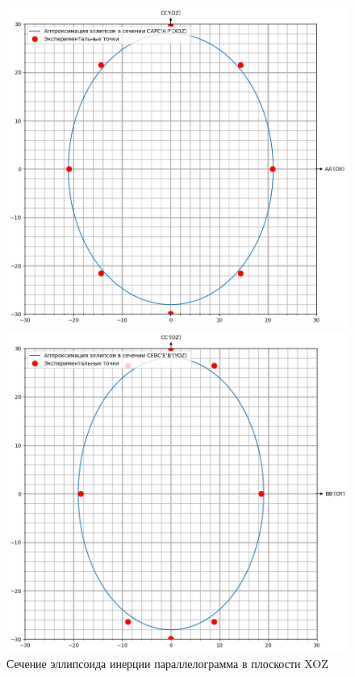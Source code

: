 \documentclass[a4paper,12pt]{article} %
\begin{document}
\begin{itemize}

\begin{figure}[!ht]
    \begin{center}
    \begin{minipage}[h]{0.49\linewidth}
    \includegraphics[width=1\linewidth]{XOZ}
    \caption{Сечение эллипсоида инерции параллелограмма в плоскости XOZ} %
    \end{minipage}
    \hfill
    \begin{minipage}[ht]{0.49\linewidth}
    \includegraphics[width=1\linewidth]{YOZ}

\end{minipage}
\end{center}
\end{figure}
\end{itemize}
\end{document}
